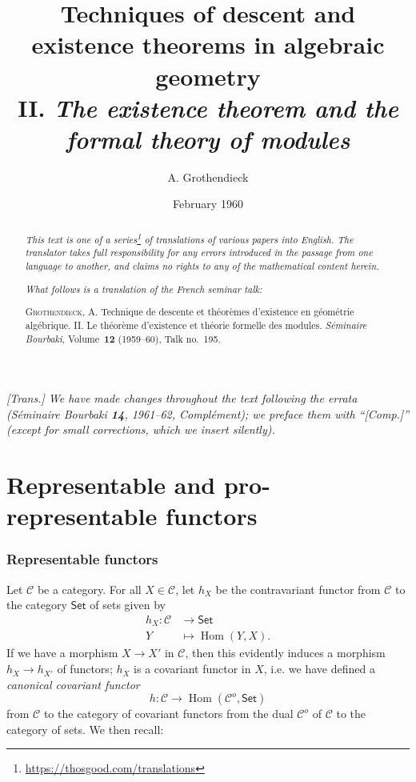 \documentclass{article}
\title{Techniques of descent and existence theorems in algebraic geometry\\II. \emph{The existence theorem and the formal theory of modules}}
\author{A. Grothendieck}
\date{February 1960}
\theoremstyle{plain}
\theoremstyle{definition}
\newcommand{\cat}[1]{{\mathcal{#1}}}
\newcommand{\Set}{\mathsf{Set}}
\DeclareMathOperator{\Hom}{Hom}
\newcommand{\oldpage}[1]{\marginpar{\footnotesize$\Big\vert$ \textit{p.~#1}}}
\begin{document}
\maketitle
\thispagestyle{fancy}

\renewcommand{\abstractname}{Translator's note.}

\begin{abstract}
  \renewcommand*{\thefootnote}{\fnsymbol{footnote}}
  \emph{This text is one of a series\footnote{\url{https://thosgood.com/translations}} of translations of various papers into English.}
  \emph{The translator takes full responsibility for any errors introduced in the passage from one language to another, and claims no rights to any of the mathematical content herein.}

  \medskip
  
  \emph{What follows is a translation of the French seminar talk:}

  \medskip\noindent
  \textsc{Grothendieck, A.}
  Technique de descente et th\'{e}or\`{e}mes d'existence en g\'{e}om\'{e}trie alg\'{e}brique. II. Le th\'{e}or\`{e}me d'existence et th\'{e}orie formelle des modules.
  \emph{S\'{e}minaire Bourbaki}, Volume~\textbf{12} (1959--60), Talk no.~195.
\end{abstract}

\setcounter{footnote}{0}

\setcounter{tocdepth}{1}
\tableofcontents



\subsubsection*{}

\emph{[Trans.] We have made changes throughout the text following the errata (\emph{S\'{e}minaire Bourbaki} \textbf{14}, 1961--62, Compl\'{e}ment); we preface them with ``[Comp.]'' (except for small corrections, which we insert silently).}
\medskip

\oldpage{195-01}
\part{Representable and pro-representable functors}
\label{A}

\section{Representable functors}
\label{A.1}

Let $\cat{C}$ be a category.
For all $X\in\cat{C}$, let $h_X$ be the contravariant functor from $\cat{C}$ to the category $\Set$ of sets given by
\[
  \begin{aligned}
    h_X\colon \cat{C} &\to \Set
  \\Y&\mapsto \Hom(Y,X).
  \end{aligned}
\]
If we have a morphism $X\to X'$ in $\cat{C}$, then this evidently induces a morphism $h_X\to h_{X'}$ of functors;
$h_X$ is a covariant functor in $X$, i.e. we have defined a \emph{canonical covariant functor}
\[
  h\colon \cat{C} \to \Hom(\cat{C}^o,\Set)
\]
from $\cat{C}$ to the category of covariant functors from the dual $\cat{C}^o$ of $\cat{C}$ to the category of sets.
We then recall:
\end{document}
